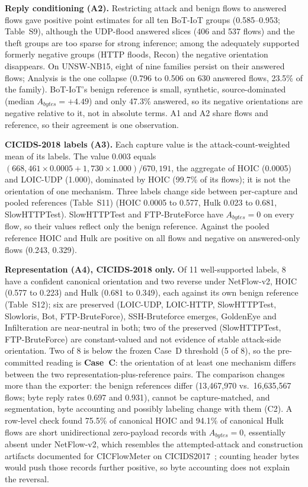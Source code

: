 \documentclass[preprint,12pt]{elsarticle}
\begin{document}
\textbf{Reply conditioning (A2).} Restricting attack and benign flows to answered flows gave positive point estimates for all ten BoT-IoT groups (0.585--0.953; Table~S9), although the UDP-flood answered slices (406 and 537 flows) and the theft groups are too sparse for strong inference; among the adequately supported formerly negative groups (HTTP floods, Recon) the negative orientation disappears. On UNSW-NB15, eight of nine families persist on their answered flows; Analysis is the one collapse (0.796 to 0.506 on 630 answered flows, 23.5\% of the family). BoT-IoT's benign reference is small, synthetic, source-dominated (median $A_{bytes}=+4.49$) and only 47.3\% answered, so its negative orientations are negative relative to it, not in absolute terms. A1 and A2 share flows and reference, so their agreement is one observation.

\textbf{CICIDS-2018 labels (A3).} Each capture value is the attack-count-weighted mean of its labels. The value 0.003 equals $(668{,}461\times0.0005+1{,}730\times1.000)/670{,}191$, the aggregate of HOIC (0.0005) and LOIC-UDP (1.000), dominated by HOIC (99.7\% of its flows); it is not the orientation of one mechanism. Three labels change side between per-capture and pooled references (Table~S11) (HOIC 0.0005 to 0.577, Hulk 0.023 to 0.681, SlowHTTPTest). SlowHTTPTest and FTP-BruteForce have $A_{bytes}=0$ on every flow, so their values reflect only the benign reference. Against the pooled reference HOIC and Hulk are positive on all flows and negative on answered-only flows (0.243, 0.329).


\textbf{Representation (A4), CICIDS-2018 only.} Of 11 well-supported labels, 8 have a confident canonical orientation and two reverse under NetFlow-v2, HOIC (0.577 to 0.223) and Hulk (0.681 to 0.349), each against its own benign reference (Table~S12); six are preserved (LOIC-UDP, LOIC-HTTP, SlowHTTPTest, Slowloris, Bot, FTP-BruteForce), SSH-Bruteforce emerges, GoldenEye and Infilteration are near-neutral in both; two of the preserved (SlowHTTPTest, FTP-BruteForce) are constant-valued and not evidence of stable attack-side orientation. Two of 8 is below the frozen Case~D threshold (5 of 8), so the pre-committed reading is \textbf{Case~C}: the orientation of at least one mechanism differs between the two representation-plus-reference pairs. The comparison changes more than the exporter: the benign references differ (13{,}467{,}970 vs.\ 16{,}635{,}567 flows; byte reply rates 0.697 and 0.931), cannot be capture-matched, and segmentation, byte accounting and possibly labeling change with them (C2). A row-level check found 75.5\% of canonical HOIC and 94.1\% of canonical Hulk flows are short unidirectional zero-payload records with $A_{bytes}=0$, essentially absent under NetFlow-v2, which resembles the attempted-attack and construction artifacts documented for CICFlowMeter on CICIDS2017~\cite{engelen2021troubleshooting}; counting header bytes would push those records further positive, so byte accounting does not explain the reversal.
\end{document}
